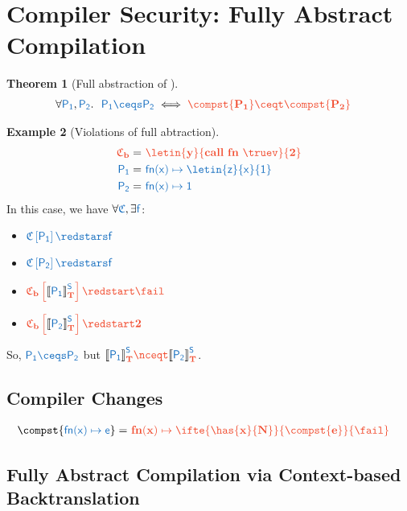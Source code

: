 \documentclass{article}
\newtheorem{theorem}{Theorem}[section]
\theoremstyle{definition}
\newtheorem{example}[theorem]{Example}
\begin{document}
\section{Compiler Security: Fully Abstract Compilation}
\begin{theorem}[Full abstraction of \compst{\cdot}]\label{thm:fa-compgen}
	\begin{align*}
		\forall \src{P_1}, \src{P_2}.~
			&\
			\src{P_1\ceqs P_2} \iff \trg{\compst{P_1}\ceqt \compst{P_2}}
	\end{align*}
\end{theorem}

\begin{example}[Violations of full abtraction]
	\begin{align*}
		\trg{\ctx_b} =&\
			\trg{\letin{y}{call~fn~\truev}{ 2 }}
		\\
		\src{P_1} =&\
			\src{fn(x)\mapsto \letin{z}{x}{1}}
		\\
		\src{P_2} =&\
			\src{fn(x)\mapsto 1}
	\end{align*}
	In this case, we have $\forall\src{\ctx},\exists\src{f}$:
	\begin{itemize}
		\item $\src{\ctx\hole{{P_1}} \redstars f}$
		\item $\src{\ctx\hole{{P_2}} \redstars f}$
		\item $\trg{\ctx_b\hole{\compgen{P_1}} \redstart \fail}$
		\item $\trg{\ctx_b\hole{\compgen{P_2}} \redstart 2}$
	\end{itemize}
	So, $\src{P_1\ceqs P_2}$ but $\trg{\compgen{P_1}\nceqt\compgen{P_2}}$.
\end{example}

\subsection{Compiler Changes}
\begin{align*}
	\compst{\src{fn(x)\mapsto e}} =&\ \trg{fn(x)\mapsto \ifte{\has{x}{N}}{\compst{e}}{\fail}}
\end{align*}

\subsection{Fully Abstract Compilation via Context-based Backtranslation}
\end{document}
